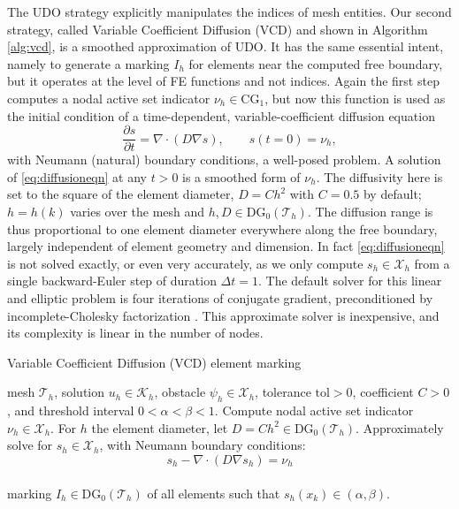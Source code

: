 \documentclass[]{interact}
\theoremstyle{plain}%
\theoremstyle{definition}
\theoremstyle{remark}
\newcommand{\grad}{\nabla}
\newcommand{\Div}{\nabla\cdot}
\newcommand{\cK}{\mathcal{K}}
\newcommand{\cT}{\mathcal{T}}
\newcommand{\cX}{\mathcal{X}}
\newcommand{\CG}{\text{CG}}
\newcommand{\DG}{\text{DG}}
\begin{document}
The UDO strategy explicitly manipulates the indices of mesh entities.  Our second strategy, called Variable Coefficient Diffusion (VCD) and shown in Algorithm \ref{alg:vcd}, is a smoothed approximation of UDO.  It has the same essential intent, namely to generate a marking $I_h$ for elements near the computed free boundary, but it operates at the level of FE functions and not indices.  Again the first step computes a nodal active set indicator $\nu_h \in \CG_1$, but now this function is used as the initial condition of a time-dependent, variable-coefficient diffusion equation
\begin{equation} \label{eq:diffusioneqn}
\frac{\partial s}{\partial t} = \Div\left(D \grad s\right), \qquad s(t=0) = \nu_h,
\end{equation}
with Neumann (natural) boundary conditions, a well-posed problem.  A solution of \eqref{eq:diffusioneqn} at any $t>0$ is a smoothed form of $\nu_h$.  The diffusivity here is set to the square of the element diameter, $D=C h^2$ with $C=0.5$ by default; $h=h(k)$ varies over the mesh and $h,D \in \DG_0(\cT_h)$.  The diffusion range is thus proportional to one element diameter everywhere along the free boundary, largely independent of element geometry and dimension.  In fact \eqref{eq:diffusioneqn} is not solved exactly, or even very accurately, as we only compute $s_h\in\cX_h$ from a single backward-Euler step of duration $\Delta t = 1$.  The default solver for this linear and elliptic problem is four iterations of conjugate gradient, preconditioned by incomplete-Cholesky factorization \cite{Bueler2021}.  This approximate solver is inexpensive, and its complexity is linear in the number of nodes.

\begin{algorithm}[ht]
	\caption{Variable Coefficient Diffusion (VCD) element marking}
	\begin{algorithmic}[1]
		\Require mesh $\cT_h$, solution $u_h \in \cK_h$, obstacle $\psi_h \in \cX_h$, tolerance $\text{tol} > 0$, coefficient $C>0$, and threshold interval $0 < \alpha < \beta < 1$.
		\State Compute nodal active set indicator $\nu_h \in \cX_h$.
		\State For $h$ the element diameter, let $D=C h^2 \in \DG_0(\cT_h)$.
		\State Approximately solve for $s_h\in\cX_h$, with Neumann boundary conditions:
		  $$s_h - \Div(D \grad s_h) = \nu_h$$ \\
		\Return marking $I_h \in \DG_0(\cT_h)$ of all elements such that $s_h(x_k) \in (\alpha,\beta)$.
    \end{algorithmic}
\label{alg:vcd}
\end{algorithm}
\end{document}
